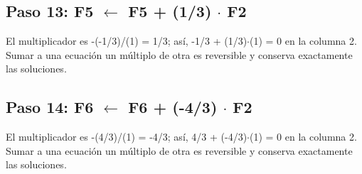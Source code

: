 \documentclass[conference]{IEEEtran}
\begin{document}

\medskip
\subsection*{Paso 13: F5 \(\leftarrow\) F5 + (1/3) \(\cdot\) F2}
El multiplicador es -(-1/3)/(1) = 1/3; así, -1/3 + (1/3)\(\cdot\)(1) = 0 en la columna 2. Sumar a una ecuación un múltiplo de otra es reversible y conserva exactamente las soluciones.


\medskip
\subsection*{Paso 14: F6 \(\leftarrow\) F6 + (-4/3) \(\cdot\) F2}
El multiplicador es -(4/3)/(1) = -4/3; así, 4/3 + (-4/3)\(\cdot\)(1) = 0 en la columna 2. Sumar a una ecuación un múltiplo de otra es reversible y conserva exactamente las soluciones.
\end{document}
